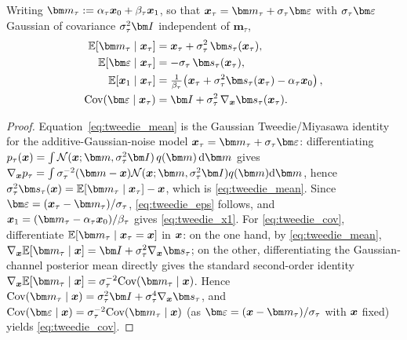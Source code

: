 \begin{lemma}\label{lem:tweedie}
Writing $\bm m_\tau := \alpha_\tau\bx_0 + \beta_\tau\bx_1$, so that $\bx_\tau = \bm m_\tau + \sigpath_\tau\latentnoise$ with $\sigpath_\tau\latentnoise$ Gaussian of covariance $\sigpath_\tau^2\bI$ independent of $\bm m_\tau$,
\begin{align}
    \E[\bm m_\tau \mid \bx_\tau] &= \bx_\tau + \sigpath_\tau^2\,\genscore_\tau(\bx_\tau), \label{eq:tweedie_mean}\\
    \E[\latentnoise \mid \bx_\tau] &= -\sigpath_\tau\,\genscore_\tau(\bx_\tau), \label{eq:tweedie_eps}\\
    \E[\bx_1 \mid \bx_\tau] &= \tfrac{1}{\beta_\tau}\!\left(\bx_\tau + \sigpath_\tau^2\genscore_\tau(\bx_\tau) - \alpha_\tau\bx_0\right), \label{eq:tweedie_x1}\\
    \cov(\latentnoise \mid \bx_\tau) &= \bI + \sigpath_\tau^2\,\nabla_{\bx}\genscore_\tau(\bx_\tau). \label{eq:tweedie_cov}
\end{align}
\end{lemma}
\begin{proof}
Equation~\eqref{eq:tweedie_mean} is the Gaussian Tweedie/Miyasawa identity for the additive-Gaussian-noise model $\bx_\tau = \bm m_\tau + \sigpath_\tau\latentnoise$: differentiating $p_\tau(\bx)=\int \mathcal{N}(\bx;\bm m,\sigpath_\tau^2\bI)\,q(\bm m)\,\rd\bm m$ gives $\nabla_{\bx} p_\tau = \int \sigpath_\tau^{-2}(\bm m-\bx)\mathcal{N}(\bx;\bm m,\sigpath_\tau^2\bI)q(\bm m)\rd\bm m$, hence $\sigpath_\tau^2\genscore_\tau(\bx) = \E[\bm m_\tau\mid\bx_\tau]-\bx$, which is \eqref{eq:tweedie_mean}. Since $\latentnoise=(\bx_\tau-\bm m_\tau)/\sigpath_\tau$, \eqref{eq:tweedie_eps} follows, and $\bx_1=(\bm m_\tau-\alpha_\tau\bx_0)/\beta_\tau$ gives \eqref{eq:tweedie_x1}. For \eqref{eq:tweedie_cov}, differentiate $\E[\bm m_\tau\mid\bx_\tau=\bx]$ in $\boldsymbol{x}$: on the one hand, by \eqref{eq:tweedie_mean}, $\nabla_{\bx}\E[\bm m_\tau\mid\bx] = \bI + \sigpath_\tau^2\nabla_{\bx}\genscore_\tau$; on the other, differentiating the Gaussian-channel posterior mean directly gives the standard second-order identity $\nabla_{\bx}\E[\bm m_\tau\mid\bx] = \sigpath_\tau^{-2}\cov(\bm m_\tau\mid\bx)$. Hence $\cov(\bm m_\tau\mid\bx)=\sigpath_\tau^2\bI+\sigpath_\tau^4\nabla_{\bx}\genscore_\tau$, and $\cov(\latentnoise\mid\bx)=\sigpath_\tau^{-2}\cov(\bm m_\tau\mid\bx)$ (as $\latentnoise=(\bx-\bm m_\tau)/\sigpath_\tau$ with $\boldsymbol{x}$ fixed) yields \eqref{eq:tweedie_cov}.
\end{proof}


